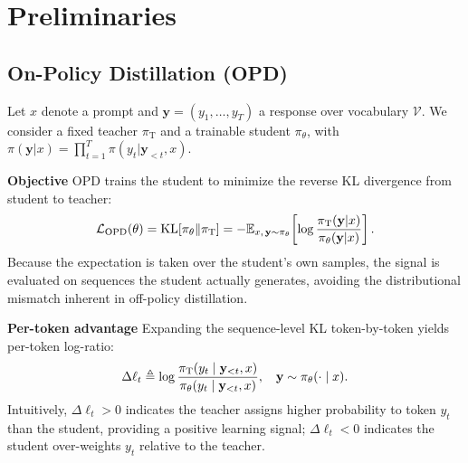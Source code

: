 \documentclass[11pt]{article}
\begin{document}


\section{Preliminaries}

\subsection{On-Policy Distillation (OPD)}\label{sec:opd-prelim}

Let $x$ denote a prompt and $\mathbf{y} = (y_1, \ldots, y_T)$ a response over vocabulary $\mathcal{V}$. We consider a fixed teacher $\pi_\mathrm{T}$ and a trainable student $\pi_\theta$, with $\pi(\mathbf{y}|x) = \prod_{t=1}^T \pi(y_t | \mathbf{y}_{<t}, x)$.

\vspace{1mm}
\noindent \textbf{Objective} \quad
OPD trains the student to minimize the reverse KL divergence from student to teacher:
\vspace{-4pt}
\begin{equation}
\small
  \label{eq:rkl}
  \mathcal{L}_\mathrm{OPD}(\theta)
  = \mathrm{KL}[\pi_\theta \| \pi_\mathrm{T}]
  = -\mathbb{E}_{x,\,\mathbf{y}\sim\pi_\theta}
    \!\left[\log\frac{\pi_\mathrm{T}(\mathbf{y}|x)}{\pi_\theta(\mathbf{y}|x)}\right].
\end{equation}
Because the expectation is taken over the student's own samples, the signal is evaluated on sequences the student actually generates, avoiding the distributional mismatch inherent in off-policy distillation.


\noindent \textbf{Per-token advantage} \quad
Expanding the sequence-level KL token-by-token yields per-token log-ratio:
\vspace{-2pt}
\begin{equation}
\small
  \label{eq:delta_lp}
  \Delta\ell_t \triangleq \log \frac{\pi_{\mathrm{T}}(y_t \mid \mathbf{y}_{<t}, x)}{\pi_\theta(y_t \mid \mathbf{y}_{<t}, x)}, \quad \mathbf{y} \sim \pi_\theta(\cdot \mid x).
\vspace{-1pt}
\end{equation}
Intuitively, $\Delta\ell_t > 0$ indicates the teacher assigns higher probability to token $y_t$ than the student, providing a positive learning signal; $\Delta\ell_t < 0$ indicates the student over-weights $y_t$ relative to the teacher.
\end{document}
